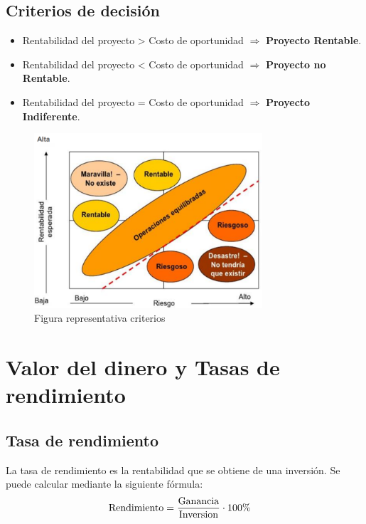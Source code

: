 \documentclass{templateNote}
\begin{document}
\subsection{Criterios de decisión}
\begin{center}
    \begin{itemize}
        \item Rentabilidad del proyecto > Costo de oportunidad $\Rightarrow$ \textbf{Proyecto Rentable}.
        \item Rentabilidad del proyecto < Costo de oportunidad $\Rightarrow$ \textbf{Proyecto no Rentable}.
        \item Rentabilidad del proyecto = Costo de oportunidad $\Rightarrow$ \textbf{Proyecto Indiferente}.
    \end{itemize}        
\end{center}
\begin{figure}[H]
    \centering
    \includegraphics[height=6.5cm]{img/costosOport.png}
    \caption{Figura representativa criterios}
\end{figure}
\newpage

\section{Valor del dinero y Tasas de rendimiento}
\subsection{Tasa de rendimiento}
\noindent La tasa de rendimiento es la rentabilidad que se obtiene de una inversión. Se puede calcular mediante la siguiente fórmula:
\begin{align*}
    \textnormal{Rendimiento} &= \frac{\textnormal{Ganancia}}{\textnormal{Inversion}} \cdot 100\%
\end{align*}
\end{document}
